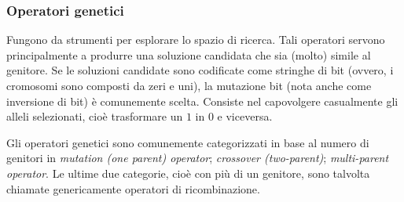 \subsubsection{Operatori genetici}
Fungono da strumenti per esplorare lo spazio di ricerca. Tali operatori servono principalmente a produrre una soluzione candidata che sia (molto) simile al genitore. Se le soluzioni candidate sono codificate come stringhe di bit (ovvero, i cromosomi sono composti da zeri e uni), la mutazione bit (nota anche come inversione di bit) è comunemente scelta. Consiste nel capovolgere casualmente gli alleli selezionati, cioè trasformare un $1$ in $0$ e viceversa. 

Gli operatori genetici sono comunemente categorizzati in base al numero di genitori in \textit{mutation (one parent) operator}; \textit{crossover (two-parent)}; \textit{multi-parent operator}. Le ultime due categorie, cioè con più di un genitore, sono talvolta chiamate genericamente operatori di ricombinazione.

